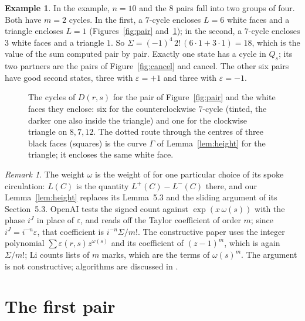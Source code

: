 \documentclass[10pt]{amsart}
\numberwithin{equation}{section}
\theoremstyle{definition}
\newtheorem{example}[equation]{Example}
\theoremstyle{remark}
\newtheorem{remark}[equation]{Remark}
\newcommand{\eps}{\varepsilon}
\newcommand{\Dc}{D}
\newcommand{\FIG}{figures/}
\begin{document}
\begin{example}\label{ex:count}
In the example, $n=10$ and the 8 pairs fall into two groups of four.
Both have $m=2$ cycles.
In the first, a $7$-cycle encloses $L=6$ white faces and a triangle encloses $L=1$ (Figures~\ref{fig:pair} and~\ref{fig:white}); in the second, a $7$-cycle encloses $3$ white faces and a triangle $1$.
So $\Sigma=(-1)^4\,2!\,(6\cdot1+3\cdot1)=18$, which is the value of the sum computed pair by pair.
Exactly one state has a cycle in $Q_s$; its two partners are the pairs of Figure~\ref{fig:cancel} and cancel.
The other six pairs have good second states, three with $\eps=+1$ and three with $\eps=-1$.
\end{example}

\begin{figure}[t]
\centering
\begin{tikzpicture}[x=0.045\textwidth,y=0.045\textwidth]\end{tikzpicture}
\caption{The cycles of $\Dc(r,s)$ for the pair of Figure~\ref{fig:pair} and the white faces they enclose: six for the counterclockwise $7$-cycle (tinted, the darker one also inside the triangle) and one for the clockwise triangle on $8,7,12$. The dotted route through the centres of three black faces (squares) is the curve $\Gamma$ of Lemma~\ref{lem:height} for the triangle; it encloses the same white face.}
\label{fig:white}
\end{figure}

\begin{remark}
The weight $\omega$ is the weight of \cite[Section~5]{openai2026} for one particular choice of its spoke circulation: $L(C)$ is the quantity $L^+(C)-L^-(C)$ there, and our Lemma~\ref{lem:height} replaces its Lemma~5.3 and the sliding argument of its Section~5.3.
OpenAI tests the signed count against $\exp(x\,\omega(s))$ with the phase $i^{J}$ in place of $\eps$, and reads off the Taylor coefficient of order $m$; since $i^{J}=i^{-n}\eps$, that coefficient is $i^{-n}\Sigma/m!$.
The constructive paper \cite{constructive2026} uses the integer polynomial $\sum\eps(r,s)z^{\omega(s)}$ and its coefficient of $(z-1)^m$, which is again $\Sigma/m!$; Li \cite{li2026} counts lists of $m$ marks, which are the terms of $\omega(s)^m$.
The argument is not constructive; algorithms are discussed in \cite{constructive2026}.
\end{remark}

\section{The first pair}\label{sec:flow}
\end{document}
